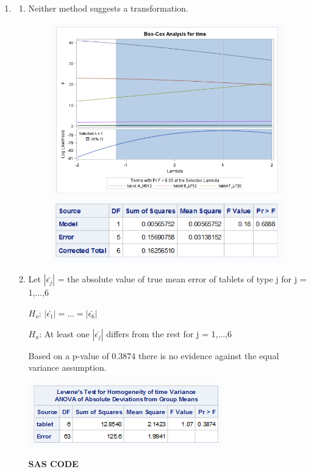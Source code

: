 \documentclass{article}\usepackage[]{graphicx}\usepackage[]{color}
\begin{document}
\begin{enumerate}

\item

\begin{enumerate} %
\item

Neither method suggests a transformation.

\begin{figure}
\centering
\begin{minipage}{.5\textwidth}
  \centering
  \includegraphics[width=.4\linewidth]{prob1a}
  \end{minipage}%
\begin{minipage}{.5\textwidth}
  \centering
  \includegraphics[width=.4\linewidth]{prob1a1}
\end{minipage}
\end{figure}


\item 

Let $|\bar{\epsilon_{j}}|$ = the absolute value of true mean error of tablets of type j for j = 1,...,6

$H_{o}$: $|\bar{\epsilon_{1}}| = ... = |\bar{\epsilon_{6}}|$

$H_{a}$: At least one $|\bar{\epsilon_{j}}|$ differs from the rest for j = 1,...,6

Based on a p-value of 0.3874 there is no evidence against the equal variance assumption.

\includegraphics{prob1b}

{\bf SAS CODE}


\end{enumerate}
\end{enumerate}
\end{document}
